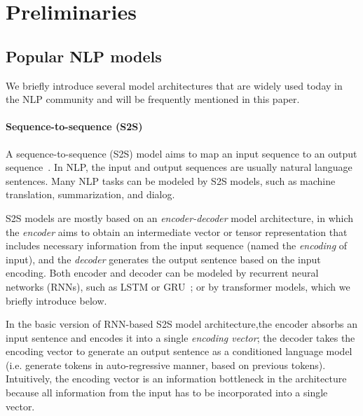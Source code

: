 \documentclass[11pt,dvipdfm]{article}
\begin{document}
\section{Preliminaries}
\subsection{Popular NLP models}
We briefly introduce several model architectures that are widely used today in the NLP community and will be frequently mentioned in this paper.

\paragraph{Sequence-to-sequence (S2S)} A sequence-to-sequence (S2S) model aims to map an input sequence to an output sequence~\cite{seq2seq}. In NLP, the input and output sequences are usually natural language sentences. Many NLP tasks can be modeled by S2S models, such as machine translation, summarization,  and dialog.

S2S models are mostly based on an \textit{encoder-decoder} model architecture, in which the \textit{encoder} aims to obtain an intermediate vector or tensor representation that includes necessary information from the input sequence (named the \textit{encoding} of input), and the \textit{decoder} generates the output sentence based on the input encoding. Both encoder and decoder can be modeled by recurrent neural networks (RNNs), such as LSTM or GRU~\cite{lstm,gru}; or by transformer models, which we briefly introduce below.


In the  basic version of RNN-based S2S model architecture,the encoder absorbs an input sentence and encodes it into a single \textit{encoding vector}; the decoder takes the encoding vector to generate an output sentence as a conditioned language model (i.e. generate tokens in auto-regressive manner, based on previous tokens). Intuitively, the encoding vector is an information bottleneck in the architecture because all information from the input has to be incorporated into a single vector.
\end{document}
